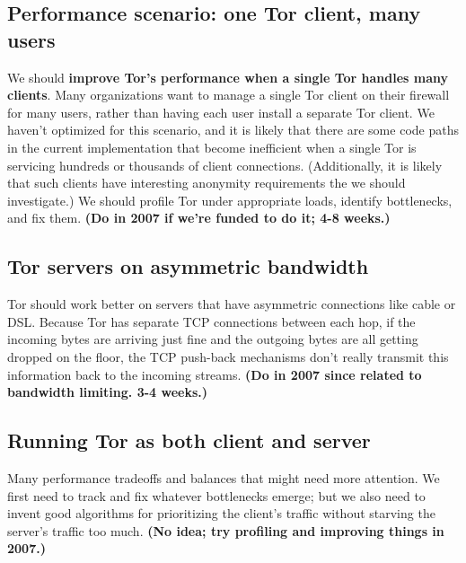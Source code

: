 \documentclass{article}
\newcommand{\plan}[1]{ {\bf (#1)}}
\begin{document}
\subsection{Performance scenario: one Tor client, many users}
We should {\bf improve Tor's performance when a single Tor handles many
  clients}.  Many organizations want to manage a single Tor client on their
firewall for many users, rather than having each user install a separate
Tor client.  We haven't optimized for this scenario, and it is likely that
there are some code paths in the current implementation that become
inefficient when a single Tor is servicing hundreds or thousands of client
connections.  (Additionally, it is likely that such clients have interesting
anonymity requirements the we should investigate.)  We should profile Tor
under appropriate loads, identify bottlenecks, and fix them.\plan{Do in 2007
  if we're funded to do it; 4-8 weeks.}

\subsection{Tor servers on asymmetric bandwidth}

Tor should work better on servers that have asymmetric connections like cable
or DSL.  Because Tor has separate TCP connections between each
hop, if the incoming bytes are arriving just fine and the outgoing bytes are
all getting dropped on the floor, the TCP push-back mechanisms don't really
transmit this information back to the incoming streams.\plan{Do in 2007 since
  related to bandwidth limiting.  3-4 weeks.}

\subsection{Running Tor as both client and server}

Many performance tradeoffs and balances that might need more attention.
We first need to track and fix whatever bottlenecks emerge; but we also
need to invent good algorithms for prioritizing the client's traffic
without starving the server's traffic too much.\plan{No idea; try
profiling and improving things in 2007.}
\end{document}
